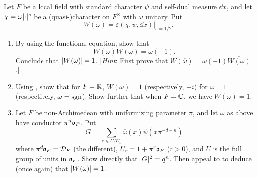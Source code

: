 \begin{exercise}[9]
  \label{ex:ch7-9}
  Let $F$ be a local field with standard character $\psi$ and self-dual
  measure $\dd x$, and let $\chi = \omega\lvert\cdot\rvert^s$ be a
  (quasi-)character on $F^\times$ with $\omega$ unitary. Put
  \[
    W(\omega) = \varepsilon(\chi, \psi, \dd x)\big|_{s=1/2}.
  \]
  \begin{enumerate}[label=(\alph*)]
    \item By using the functional equation, show that
      \[
        W(\omega) W(\overline{\omega}) = \omega(-1).
      \]
      Conclude that $\lvert W(\omega)\rvert = 1$. [\emph{Hint}: First prove that
      $W(\overline{\omega}) = \omega(-1)\overline{W(\omega)}$.]
    \item Using , show that for $F = \mathbb{R}$, $W(\omega) = 1$
      (respectively, $-i$) for $\omega = 1$ (respectively, $\omega = \operatorname{sgn}$).
      Show further that when $F = \mathbb{C}$, we have $W(\omega) = 1$.
    \item Let $F$ be non-Archimedean with uniformizing parameter $\pi$, and
      let $\omega$ as above have conductor $\pi^n\mathfrak{o}_F$. Put
      \[
        G = \sum_{x \in U/U_n} \overline{\omega}(x) \psi(x\pi^{-d-n})
      \]
      where $\pi^d\mathfrak{o}_F = \mathcal{D}_F$ (the different),
      $U_r = 1 + \pi^r\mathfrak{o}_F$ ($r > 0$), and $U$ is the full group of units
      in $\mathfrak{o}_F$. Show directly that $\lvert G\rvert^2 = q^n$. Then appeal to
       to deduce (once again) that $\lvert W(\omega)\rvert = 1$.
  \end{enumerate}
\end{exercise}

